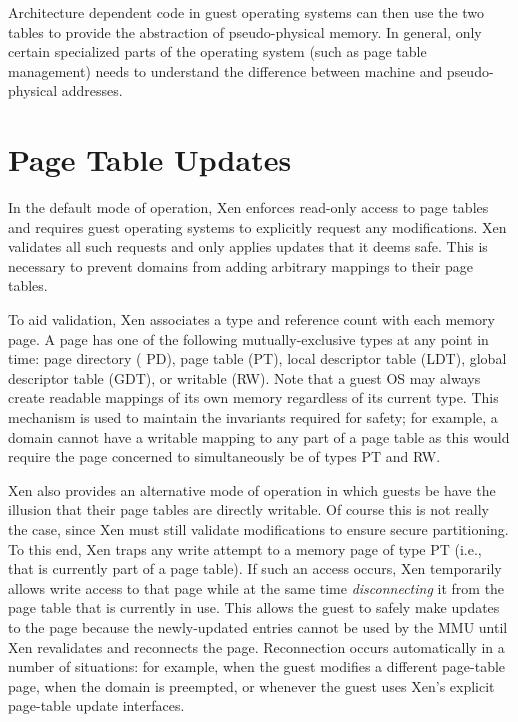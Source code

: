 \documentclass[11pt,twoside,final,openright]{report}
\begin{document}
Architecture dependent code in guest operating systems can then use
the two tables to provide the abstraction of pseudo-physical
memory. In general, only certain specialized parts of the operating
system (such as page table management) needs to understand the
difference between machine and pseudo-physical addresses.

\section{Page Table Updates}

In the default mode of operation, Xen enforces read-only access to
page tables and requires guest operating systems to explicitly request
any modifications.  Xen validates all such requests and only applies
updates that it deems safe.  This is necessary to prevent domains from
adding arbitrary mappings to their page tables.

To aid validation, Xen associates a type and reference count with each
memory page. A page has one of the following
mutually-exclusive types at any point in time: page directory ({\sf
PD}), page table ({\sf PT}), local descriptor table ({\sf LDT}),
global descriptor table ({\sf GDT}), or writable ({\sf RW}). Note that
a guest OS may always create readable mappings of its own memory 
regardless of its current type. 
This mechanism is used to
maintain the invariants required for safety; for example, a domain
cannot have a writable mapping to any part of a page table as this
would require the page concerned to simultaneously be of types {\sf
  PT} and {\sf RW}.



Xen also provides an alternative mode of operation in which guests be
have the illusion that their page tables are directly writable.  Of
course this is not really the case, since Xen must still validate
modifications to ensure secure partitioning. To this end, Xen traps
any write attempt to a memory page of type {\sf PT} (i.e., that is
currently part of a page table).  If such an access occurs, Xen
temporarily allows write access to that page while at the same time
{\em disconnecting} it from the page table that is currently in
use. This allows the guest to safely make updates to the page because
the newly-updated entries cannot be used by the MMU until Xen
revalidates and reconnects the page.
Reconnection occurs automatically in a number of situations: for
example, when the guest modifies a different page-table page, when the
domain is preempted, or whenever the guest uses Xen's explicit
page-table update interfaces.
\end{document}
